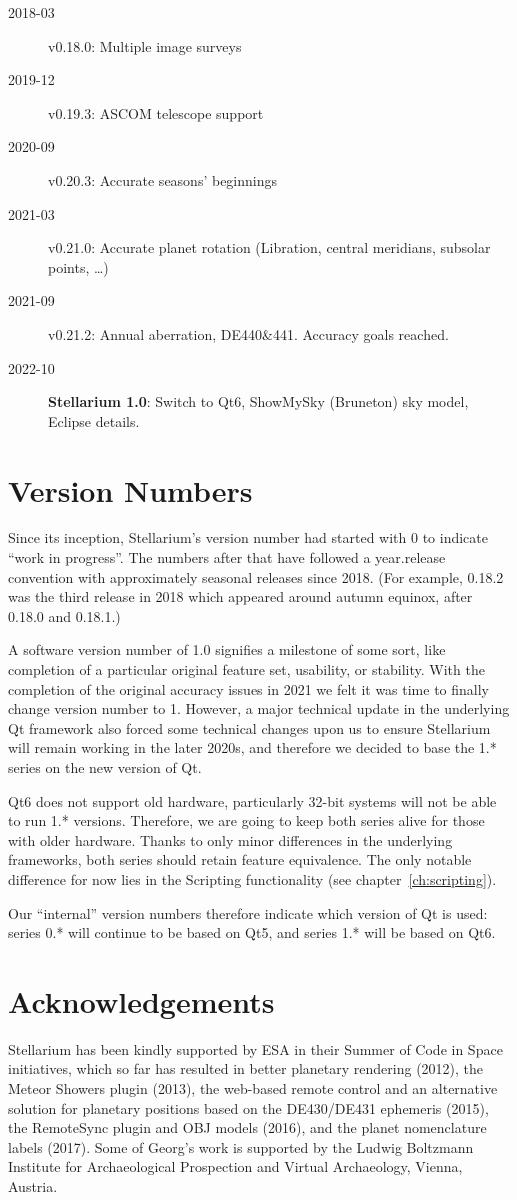 \begin{description}
\item[2018-03] v0.18.0: Multiple image surveys
\item[2019-12] v0.19.3: ASCOM telescope support 
\item[2020-09] v0.20.3: Accurate seasons' beginnings
\item[2021-03] v0.21.0: Accurate planet rotation (Libration, central meridians, subsolar points, \ldots) 
\item[2021-09] v0.21.2: Annual aberration, DE440\&441. Accuracy goals reached.
\item[2022-10] \textbf{Stellarium 1.0}: Switch to Qt6, ShowMySky (Bruneton) sky model, Eclipse details. 
\end{description}

\section{Version Numbers}
Since its inception, Stellarium's version number had started with 0 to
indicate ``work in progress''. The numbers after that have followed a
year.release convention with approximately seasonal releases since
2018. (For example, 0.18.2 was the third release in 2018 which
appeared around autumn equinox, after 0.18.0 and 0.18.1.)

A software version number of 1.0 signifies a milestone of some sort,
like completion of a particular original feature set, usability, or
stability. With the completion of the original accuracy issues in 2021
we felt it was time to finally change version number to 1. However, a
major technical update in the underlying Qt framework also forced some
technical changes upon us to ensure Stellarium will remain working in
the later 2020s, and therefore we decided to base the 1.* series on
the new version of Qt.

Qt6 does not support old hardware, particularly 32-bit systems will
not be able to run 1.* versions.  Therefore, we are going to keep both
series alive for those with older hardware. Thanks to only minor
differences in the underlying frameworks, both series should retain
feature equivalence. The only notable difference for now lies in the
Scripting functionality (see chapter~\ref{ch:scripting}).

Our ``internal'' version numbers therefore indicate which version of Qt is used:
series 0.* will continue to be based on Qt5, and series 1.* will be
based on Qt6.

\section{Acknowledgements}
Stellarium has been kindly supported by ESA in their Summer of Code in
Space initiatives, which so far has resulted in better planetary rendering
(2012), the Meteor Showers plugin (2013), the web-based remote
control and an alternative solution for planetary positions based on
the DE430/DE431 ephemeris (2015), the RemoteSync plugin and OBJ models (2016), 
and the planet nomenclature labels (2017). Some of Georg's work is
supported by the Ludwig Boltzmann Institute for Archaeological
Prospection and Virtual Archaeology, Vienna, Austria.

